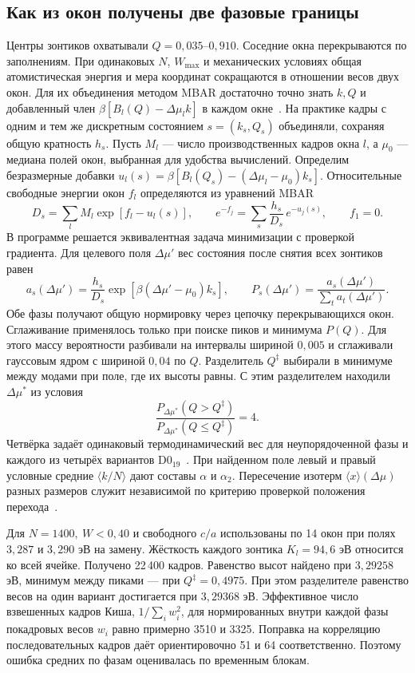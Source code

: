 \subsection{Как из окон получены две фазовые границы}
Центры зонтиков охватывали \(Q=0{,}035\)--\(0{,}910\).
Соседние окна перекрываются по заполнениям. При одинаковых \(N\),
\(W_{\max}\) и механических условиях общая атомистическая энергия и
мера координат сокращаются в отношении весов двух окон. Для их объединения
методом MBAR достаточно точно знать \(k,Q\) и добавленный член
\(\beta[B_l(Q)-\Delta\mu_l k]\) в каждом окне~\cite{mbar2008}.
На практике кадры с одним и тем же дискретным состоянием \(s=(k_s,Q_s)\)
объединяли, сохраняя общую кратность \(h_s\). Пусть \(M_l\) — число
производственных кадров окна \(l\), а \(\mu_0\) — медиана полей окон,
выбранная для удобства вычислений. Определим безразмерные добавки
\(u_l(s)=\beta[B_l(Q_s)-(\Delta\mu_l-\mu_0)k_s]\).
Относительные свободные энергии окон \(f_l\) определяются из уравнений MBAR
\begin{equation}
 D_s=\sum_l M_l\exp[f_l-u_l(s)],\qquad
 e^{-f_j}=\sum_s \frac{h_s}{D_s}\,e^{-u_j(s)},\qquad f_1=0 .
 \label{eq:umbrella-mbar}
\end{equation}
В программе решается эквивалентная задача минимизации с проверкой
градиента. Для целевого поля \(\Delta\mu'\) вес состояния после снятия
всех зонтиков равен
\[
 a_s(\Delta\mu')=\frac{h_s}{D_s}\exp[\beta(\Delta\mu'-\mu_0)k_s],
 \qquad P_s(\Delta\mu')=\frac{a_s(\Delta\mu')}{\sum_t a_t(\Delta\mu')}.
\]
Обе фазы получают общую нормировку через цепочку перекрывающихся окон.
Сглаживание применялось только при поиске пиков и минимума \(P(Q)\).
Для этого массу вероятности разбивали на интервалы шириной \(0{,}005\)
и сглаживали гауссовым ядром с шириной \(0{,}04\) по \(Q\).
Разделитель \(Q^\ddagger\) выбирали в минимуме между модами
при поле, где их высоты равны. С этим разделителем находили \(\Delta\mu^*\)
из условия
\[
 \frac{P_{\Delta\mu^*}(Q>Q^\ddagger)}
      {P_{\Delta\mu^*}(Q\le Q^\ddagger)}=4 .
\]
Четвёрка задаёт одинаковый термодинамический вес для неупорядоченной фазы
и каждого из четырёх вариантов D0$_{19}$~\cite{janke1993}.
При найденном поле левый и правый условные средние \(\langle k/N\rangle\)
дают составы \(\alpha\) и \(\alpha_2\). Пересечение изотерм
\(\langle x\rangle(\Delta\mu)\) разных размеров служит независимой по
критерию проверкой положения перехода~\cite{borgs1992}.

Для \(N=1400,\ W<0{,}40\) и свободного \(c/a\) использованы по 14 окон
при полях \(3{,}287\) и \(3{,}290\) эВ на замену. Жёсткость каждого
зонтика \(K_l=94{,}6\) эВ относится ко всей ячейке. Получено 22\,400
кадров. Равенство высот найдено при \(3{,}29258\) эВ, минимум между
пиками — при \(Q^\ddagger=0{,}4975\). При этом разделителе равенство
весов на один вариант достигается при \(3{,}29368\) эВ. Эффективное
число взвешенных кадров Киша, \(1/\sum_i w_i^2\), для нормированных
внутри каждой фазы покадровых весов \(w_i\) равно примерно 3510 и 3325.
Поправка на корреляцию последовательных кадров даёт ориентировочно
51 и 64 соответственно. Поэтому ошибка средних по фазам оценивалась
по временным блокам.

